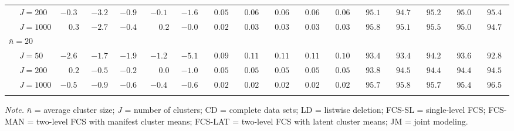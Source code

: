 \begin{sidewaystable}
\begin{threeparttable}
\begin{tabular}{llccccccccccccccc}
 & \nopagebreak $\;J=200$  & ${-}0.3\phantom{0}$ & ${-}3.2\phantom{0}$ & ${-}0.9\phantom{0}$ & ${-}0.1\phantom{0}$ & ${-}1.6\phantom{0}$ & $\phantom{0}0.05\phantom{0}$ & $\phantom{0}0.06\phantom{0}$ & $\phantom{0}0.06\phantom{0}$ & $\phantom{0}0.06\phantom{0}$ & $\phantom{0}0.06\phantom{0}$ & $\phantom{0}95.1\phantom{0}$ & $\phantom{0}94.7\phantom{0}$ & $\phantom{0}95.2\phantom{0}$ & $\phantom{0}95.0\phantom{0}$ & $\phantom{0}95.4\phantom{0}$ \\
 & \nopagebreak $\;J=1000$  & $\phantom{-}0.3\phantom{0}$ & ${-}2.7\phantom{0}$ & ${-}0.4\phantom{0}$ & $\phantom{-}0.2\phantom{0}$ & ${-}0.0\phantom{0}$ & $\phantom{0}0.02\phantom{0}$ & $\phantom{0}0.03\phantom{0}$ & $\phantom{0}0.03\phantom{0}$ & $\phantom{0}0.03\phantom{0}$ & $\phantom{0}0.03\phantom{0}$ & $\phantom{0}95.8\phantom{0}$ & $\phantom{0}95.1\phantom{0}$ & $\phantom{0}95.5\phantom{0}$ & $\phantom{0}95.0\phantom{0}$ & $\phantom{0}94.7\phantom{0}$ \\
\multicolumn{4}{l}{$\bar{n}=20$} \\  & \nopagebreak $\;J=50$  & ${-}2.6\phantom{0}$ & ${-}1.7\phantom{0}$ & ${-}1.9\phantom{0}$ & ${-}1.2\phantom{0}$ & ${-}5.1\phantom{0}$ & $\phantom{0}0.09\phantom{0}$ & $\phantom{0}0.11\phantom{0}$ & $\phantom{0}0.11\phantom{0}$ & $\phantom{0}0.11\phantom{0}$ & $\phantom{0}0.10\phantom{0}$ & $\phantom{0}93.4\phantom{0}$ & $\phantom{0}93.4\phantom{0}$ & $\phantom{0}94.2\phantom{0}$ & $\phantom{0}93.6\phantom{0}$ & $\phantom{0}92.8\phantom{0}$ \\
 & \nopagebreak $\;J=200$  & $\phantom{-}0.2\phantom{0}$ & ${-}0.5\phantom{0}$ & ${-}0.2\phantom{0}$ & $\phantom{-}0.0\phantom{0}$ & ${-}1.0\phantom{0}$ & $\phantom{0}0.05\phantom{0}$ & $\phantom{0}0.05\phantom{0}$ & $\phantom{0}0.05\phantom{0}$ & $\phantom{0}0.05\phantom{0}$ & $\phantom{0}0.05\phantom{0}$ & $\phantom{0}93.8\phantom{0}$ & $\phantom{0}94.5\phantom{0}$ & $\phantom{0}94.4\phantom{0}$ & $\phantom{0}94.4\phantom{0}$ & $\phantom{0}94.5\phantom{0}$ \\
 & \nopagebreak $\;J=1000$  & ${-}0.5\phantom{0}$ & ${-}0.9\phantom{0}$ & ${-}0.6\phantom{0}$ & ${-}0.4\phantom{0}$ & ${-}0.6\phantom{0}$ & $\phantom{0}0.02\phantom{0}$ & $\phantom{0}0.02\phantom{0}$ & $\phantom{0}0.02\phantom{0}$ & $\phantom{0}0.02\phantom{0}$ & $\phantom{0}0.02\phantom{0}$ & $\phantom{0}95.7\phantom{0}$ & $\phantom{0}95.8\phantom{0}$ & $\phantom{0}95.7\phantom{0}$ & $\phantom{0}95.4\phantom{0}$ & $\phantom{0}96.5\phantom{0}$ \\
[0.5ex]\hline\\[-1.6ex] 
\end{tabular}
\begin{tablenotes}{\footnotesize \textit{Note.} $\bar{n}$ = average cluster size; $J$ = number of clusters; CD = complete data sets; LD = listwise deletion; FCS-SL = single-level FCS; FCS-MAN = two-level FCS with manifest cluster means; FCS-LAT = two-level FCS with latent cluster means; JM = joint modeling.}\end{tablenotes}
\end{threeparttable}
\end{sidewaystable}
